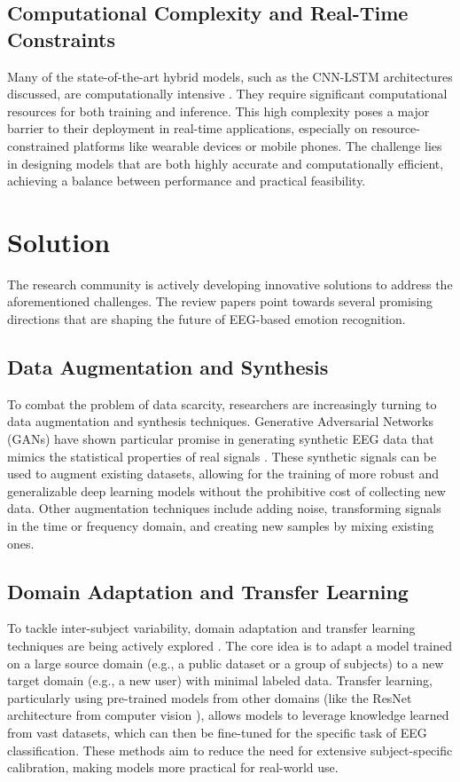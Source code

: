 \documentclass[conference]{IEEEtran}
\begin{document}
\subsection*{Computational Complexity and Real-Time Constraints}
Many of the state-of-the-art hybrid models, such as the CNN-LSTM architectures discussed, are computationally intensive \cite{b2}. They require significant computational resources for both training and inference. This high complexity poses a major barrier to their deployment in real-time applications, especially on resource-constrained platforms like wearable devices or mobile phones. The challenge lies in designing models that are both highly accurate and computationally efficient, achieving a balance between performance and practical feasibility.

\section{Solution}
The research community is actively developing innovative solutions to address the aforementioned challenges. The review papers point towards several promising directions that are shaping the future of EEG-based emotion recognition.

\subsection*{Data Augmentation and Synthesis}
To combat the problem of data scarcity, researchers are increasingly turning to data augmentation and synthesis techniques. Generative Adversarial Networks (GANs) have shown particular promise in generating synthetic EEG data that mimics the statistical properties of real signals \cite{b8}. These synthetic signals can be used to augment existing datasets, allowing for the training of more robust and generalizable deep learning models without the prohibitive cost of collecting new data. Other augmentation techniques include adding noise, transforming signals in the time or frequency domain, and creating new samples by mixing existing ones.

\subsection*{Domain Adaptation and Transfer Learning}
To tackle inter-subject variability, domain adaptation and transfer learning techniques are being actively explored \cite{b7}. The core idea is to adapt a model trained on a large source domain (e.g., a public dataset or a group of subjects) to a new target domain (e.g., a new user) with minimal labeled data. Transfer learning, particularly using pre-trained models from other domains (like the ResNet architecture from computer vision \cite{b1}), allows models to leverage knowledge learned from vast datasets, which can then be fine-tuned for the specific task of EEG classification. These methods aim to reduce the need for extensive subject-specific calibration, making models more practical for real-world use.
\end{document}
